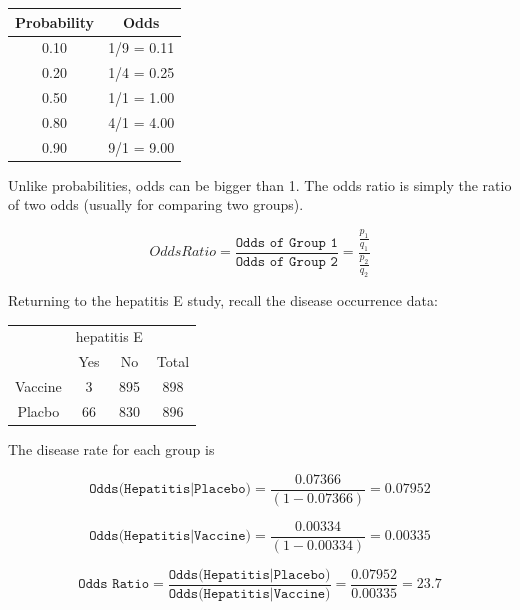 \documentclass[11pt, chapterprefix=true]{scrbook}\usepackage[]{graphicx}\usepackage[]{color}
\begin{document}
\begin{table}[ht]
\centering
\begin{tabular}{@{} cc @{}} \hline
Probability & Odds \\ \hline
0.10 & 1/9 = 0.11 \\
0.20 & 1/4 = 0.25 \\
0.50 & 1/1 = 1.00 \\
0.80 & 4/1 = 4.00 \\
0.90 & 9/1 = 9.00 \\ \hline
\end{tabular}
\end{table}

Unlike probabilities, odds can be bigger than 1.  The odds ratio is simply the ratio of two odds (usually for comparing two groups).

\begin{equation*}
  Odds Ratio = \frac{ \texttt{Odds of Group 1}}{\texttt{Odds of Group 2}} = \frac{ \frac{p_1}{q_1}}{ \frac{p_2}{q_2}}
\end{equation*}

Returning to the hepatitis E study, recall the disease occurrence data:

\begin{table}[ht]
\centering
\begin{tabular}{@{} cccc @{}} \hline
 & \multicolumn{2}{c}{hepatitis E} \\
 & Yes & No & Total \\ \hline
 Vaccine & 3 & 895 & 898 \\
 Placbo  & 66 & 830 & 896 \\ \hline
 \end{tabular}
 \end{table}

The disease rate for each group is

\begin{equation*}
  \texttt{Odds(Hepatitis|Placebo)} = \frac{0.07366}{(1-0.07366)} = 0.07952
\end{equation*}

\begin{equation*}
  \texttt{Odds(Hepatitis|Vaccine)} = \frac{0.00334}{(1-0.00334)} = 0.00335
\end{equation*}

\begin{equation*}
  \texttt{Odds Ratio} = \frac{\texttt{Odds(Hepatitis|Placebo)}}{\texttt{Odds(Hepatitis|Vaccine)}} = \frac{0.07952}{0.00335} = 23.7
\end{equation*}
\end{document}
